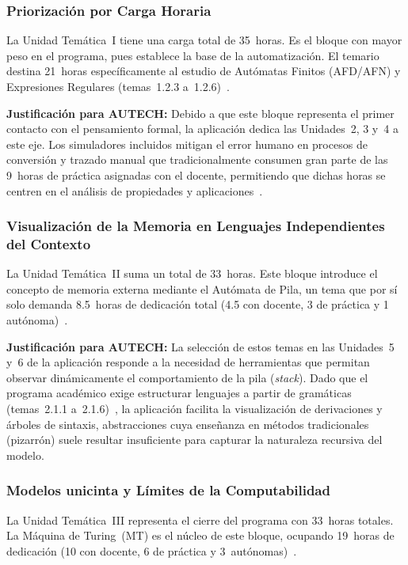 \subsubsection*{Priorización por Carga Horaria}

La Unidad Temática~I tiene una carga total de 35~horas. Es el bloque con mayor peso en el
programa, pues establece la base de la automatización. El temario destina 21~horas
específicamente al estudio de Autómatas Finitos (AFD/AFN) y Expresiones Regulares
(temas~1.2.3 a~1.2.6)~\cite{ipn2020}.

\textbf{Justificación para AUTECH:} Debido a que este bloque representa el primer contacto
con el pensamiento formal, la aplicación dedica las Unidades~2, 3 y~4 a este eje. Los
simuladores incluidos mitigan el error humano en procesos de conversión y trazado manual que
tradicionalmente consumen gran parte de las 9~horas de práctica asignadas con el docente,
permitiendo que dichas horas se centren en el análisis de propiedades y
aplicaciones~\cite{ipn2020}.

\subsubsection*{Visualización de la Memoria en Lenguajes Independientes del Contexto}

La Unidad Temática~II suma un total de 33~horas. Este bloque introduce el concepto de memoria
externa mediante el Autómata de Pila, un tema que por sí solo demanda 8.5~horas de dedicación
total (4.5 con docente, 3 de práctica y 1 autónoma)~\cite{ipn2020}.

\textbf{Justificación para AUTECH:} La selección de estos temas en las Unidades~5 y~6 de la
aplicación responde a la necesidad de herramientas que permitan observar dinámicamente el
comportamiento de la pila (\textit{stack}). Dado que el programa académico exige estructurar
lenguajes a partir de gramáticas (temas~2.1.1 a~2.1.6)~\cite{ipn2020}, la aplicación facilita
la visualización de derivaciones y árboles de sintaxis, abstracciones cuya enseñanza en
métodos tradicionales (pizarrón) suele resultar insuficiente para capturar la naturaleza
recursiva del modelo.

\subsubsection*{Modelos unicinta y Límites de la Computabilidad}

La Unidad Temática~III representa el cierre del programa con 33~horas totales. La Máquina de
Turing~(MT) es el núcleo de este bloque, ocupando 19~horas de dedicación (10 con docente,
6 de práctica y 3~autónomas)~\cite{ipn2020}.

